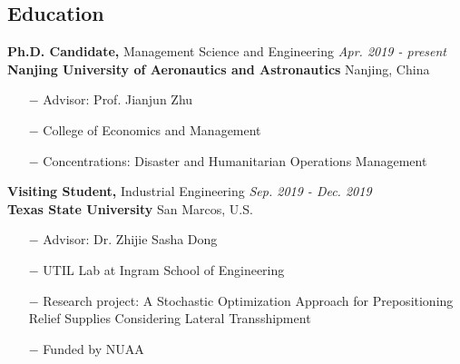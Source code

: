 \documentclass[margin]{res}
\begin{document}
 


\address{\\ [5pt]
Nanjing University of Aeronautics and Astronautics (NUAA) \\
29 Jiangjun Avenue  \\
Nanjing Jiangsu, 211106 China}
\address{\small \it
\hfill Updated: \today \\ [5pt]
Email: \hfill m@guo.ph \\
Homepage: \hfill \href{https://guo.ph}{https://guo.ph} \\[5pt]
}


\begin{resume} 


\vspace{-.8em}
\section{\sc Education}


{\bf Ph.D. Candidate,}  Management Science and Engineering \hfill {\it Apr. 2019 - present}\\
{\bf Nanjing University of Aeronautics and Astronautics} \hfill Nanjing, China
\begin{itemize}  \itemsep -2pt  %
\item[\(-\)] Advisor: Prof. Jianjun Zhu
\item[\(-\)] College of Economics and Management
\item[\(-\)] Concentrations: Disaster and Humanitarian Operations Management
\end{itemize}
\vspace{-.8em}


{\bf Visiting Student,} Industrial Engineering \hfill {\it Sep. 2019 - Dec. 2019}\\
{\bf Texas State University} \hfill San Marcos, U.S.
\begin{itemize}   \itemsep -2pt  %
\item[\(-\)] Advisor: Dr. Zhijie Sasha Dong
\item[\(-\)] UTIL Lab at Ingram School of Engineering
\item[\(-\)] Research project: A Stochastic Optimization Approach for Prepositioning Relief Supplies Considering Lateral Transshipment
\item[\(-\)] Funded by NUAA
\end{itemize}
\vspace{-.8em}


\end{resume}
\end{document}

